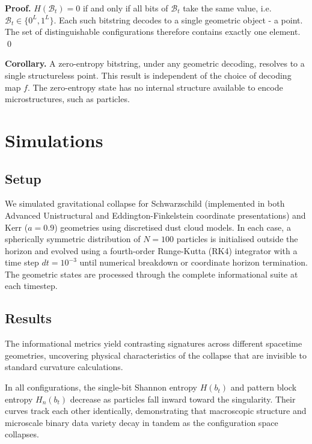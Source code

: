 \documentclass[11pt]{article}
\begin{document}
\textbf{Proof.} $H(\mathcal{B}_t) = 0$ if and only if all bits of
$\mathcal{B}_t$ take the same value, i.e.\ $\mathcal{B}_t \in
\{0^L, 1^L\}$. Each such bitstring decodes to a
single geometric object - a point. The set of distinguishable configurations
therefore contains exactly one element. \qed

\textbf{Corollary.} A zero-entropy bitstring, under any geometric
decoding, resolves to a single structureless point. This result is
independent of the choice of decoding map $f$.
The zero-entropy state has no internal structure available to encode
microstructures, such as particles.

\section{Simulations}
\label{sec:simulations}

\subsection{Setup}

We simulated gravitational collapse for Schwarzschild (implemented in both 
Advanced Unistructural and Eddington-Finkelstein coordinate presentations) 
and Kerr ($a = 0.9$) geometries using discretised dust cloud models. 
In each case, a spherically symmetric distribution of $N=100$ particles is 
initialised outside the horizon and evolved using a fourth-order Runge-Kutta (RK4) 
integrator with a time step $dt = 10^{-3}$ until numerical breakdown or coordinate 
horizon termination. The geometric states are processed through the complete 
informational suite at each timestep. 

\subsection{Results}

The informational metrics yield contrasting signatures across different spacetime geometries, 
uncovering physical characteristics of the collapse that are invisible to standard curvature calculations.

In all configurations, the single-bit Shannon entropy $H(b_t)$ and pattern block entropy 
$H_n(b_t)$ decrease as particles fall inward toward the singularity. Their 
curves track each other identically, demonstrating that macroscopic structure and microscale binary data 
variety decay in tandem as the configuration space collapses.
\end{document}
